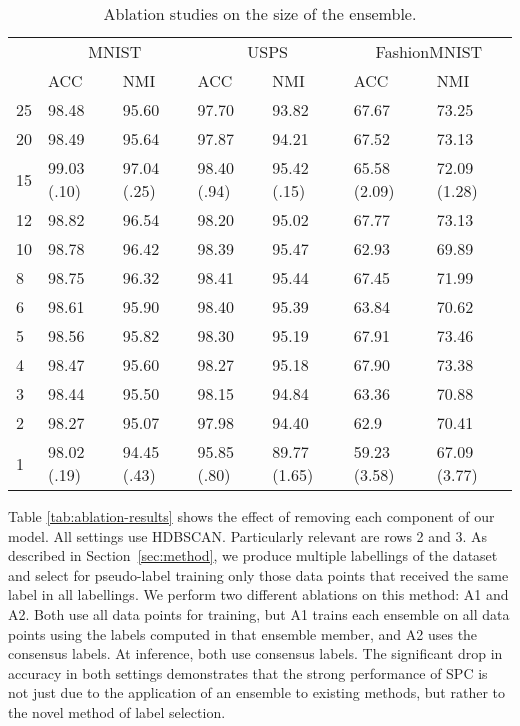 \documentclass[runningheads]{llncs}
\begin{document}
\begin{table*}[t]\centering
  \footnotesize
\vspace*{-0.5ex}
 \centering
  \footnotesize
  \begin{tabular}{@{}lllllll@{}}
    \toprule
    & \multicolumn{2}{c}{MNIST} & \multicolumn{2}{c}{USPS} & \multicolumn{2}{c}{FashionMNIST}        \\
    \cmidrule(r){2-3}  \cmidrule(r){4-5}  \cmidrule(r){6-7}
    & ACC & NMI & ACC & NMI & ACC & NMI \\
    \midrule
    25 & 98.48 & 95.60 & 97.70 & 93.82 & 67.67 & 73.25 \\
    20 & 98.49 & 95.64 & 97.87 & 94.21 & 67.52 & 73.13 \\
    15 & 99.03 (.10) & 97.04 (.25) & 98.40 (.94) & 95.42 (.15) & 65.58 (2.09) & 72.09 (1.28) \\
    12 & 98.82 & 96.54 & 98.20 & 95.02 & 67.77 & 73.13 \\
    10 & 98.78 & 96.42 & 98.39 & 95.47 & 62.93 & 69.89 \\
    8 & 98.75& 96.32 & 98.41 & 95.44 & 67.45 & 71.99 \\
    6 & 98.61 & 95.90 & 98.40 & 95.39 & 63.84 & 70.62 \\
    5 & 98.56 & 95.82 & 98.30 & 95.19 & 67.91 & 73.46 \\
    4 & 98.47 & 95.60 & 98.27 & 95.18 & 67.90 & 73.38 \\
    3 & 98.44 & 95.50 & 98.15 & 94.84 & 63.36 & 70.88 \\
    2 & 98.27 & 95.07 & 97.98 & 94.40 & 62.9 & 70.41 \\
    1 & 98.02 (.19) & 94.45 (.43) & 95.85 (.80) & 89.77 (1.65) & 59.23 (3.58) & 67.09 (3.77) \\
    \hline
    \end{tabular}\vspace*{2ex}
\caption{\footnotesize Ablation studies on the size of the ensemble.}
\vspace*{-5ex}
\label{tab:ensemble-size-ablation}\end{table*} 


\noindent Table \ref{tab:ablation-results} shows the effect of removing each component of our model. All settings use HDBSCAN. Particularly relevant are rows 2 and 3. As described in Section~\ref{sec:method}, we produce multiple labellings of the dataset and select for pseudo-label training only those data points that received the same label in all labellings. We perform two different ablations on this method: A1 and A2. Both use all data points for training, but A1 trains each ensemble on all data points using the labels computed in that ensemble member, and A2 uses the consensus labels. At inference, both use consensus labels. The significant drop in accuracy in both settings demonstrates that the strong performance of SPC is not just due to the application of an ensemble to existing methods, but rather to the novel method of label selection. 
\end{document}
